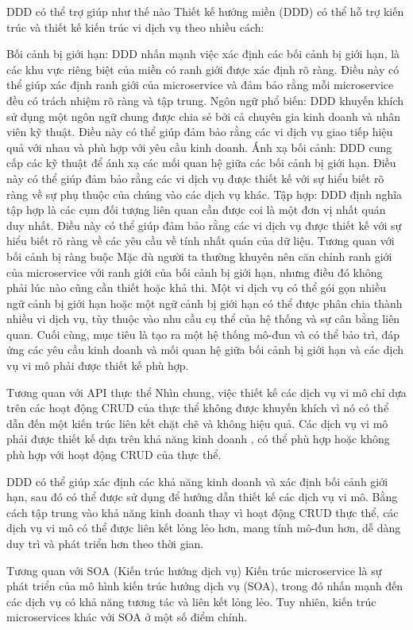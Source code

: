 DDD có thể trợ giúp như thế nào
Thiết kế hướng miền (DDD) có thể hỗ trợ kiến ​​trúc và thiết kế kiến ​​trúc vi dịch vụ theo nhiều cách:

Bối cảnh bị giới hạn: DDD nhấn mạnh việc xác định các bối cảnh bị giới hạn, là các khu vực riêng biệt của miền có ranh giới được xác định rõ ràng. Điều này có thể giúp xác định ranh giới của microservice và đảm bảo rằng mỗi microservice đều có trách nhiệm rõ ràng và tập trung.
Ngôn ngữ phổ biến: DDD khuyến khích sử dụng một ngôn ngữ chung được chia sẻ bởi cả chuyên gia kinh doanh và nhân viên kỹ thuật. Điều này có thể giúp đảm bảo rằng các vi dịch vụ giao tiếp hiệu quả với nhau và phù hợp với yêu cầu kinh doanh.
Ánh xạ bối cảnh: DDD cung cấp các kỹ thuật để ánh xạ các mối quan hệ giữa các bối cảnh bị giới hạn. Điều này có thể giúp đảm bảo rằng các vi dịch vụ được thiết kế với sự hiểu biết rõ ràng về sự phụ thuộc của chúng vào các dịch vụ khác.
Tập hợp: DDD định nghĩa tập hợp là các cụm đối tượng liên quan cần được coi là một đơn vị nhất quán duy nhất. Điều này có thể giúp đảm bảo rằng các vi dịch vụ được thiết kế với sự hiểu biết rõ ràng về các yêu cầu về tính nhất quán của dữ liệu.
Tương quan với bối cảnh bị ràng buộc
Mặc dù người ta thường khuyên nên căn chỉnh ranh giới của microservice với ranh giới của bối cảnh bị giới hạn, nhưng điều đó không phải lúc nào cũng cần thiết hoặc khả thi. Một vi dịch vụ có thể gói gọn nhiều ngữ cảnh bị giới hạn hoặc một ngữ cảnh bị giới hạn có thể được phân chia thành nhiều vi dịch vụ, tùy thuộc vào nhu cầu cụ thể của hệ thống và sự cân bằng liên quan. Cuối cùng, mục tiêu là tạo ra một hệ thống mô-đun và có thể bảo trì, đáp ứng các yêu cầu kinh doanh và mối quan hệ giữa bối cảnh bị giới hạn và các dịch vụ vi mô phải được thiết kế phù hợp.

Tương quan với API thực thể
Nhìn chung, việc thiết kế các dịch vụ vi mô chỉ dựa trên các hoạt động CRUD của thực thể không được khuyến khích vì nó có thể dẫn đến một kiến ​​trúc liên kết chặt chẽ và không hiệu quả. Các dịch vụ vi mô phải được thiết kế dựa trên khả năng kinh doanh , có thể phù hợp hoặc không phù hợp với hoạt động CRUD của thực thể.

DDD có thể giúp xác định các khả năng kinh doanh và xác định bối cảnh giới hạn, sau đó có thể được sử dụng để hướng dẫn thiết kế các dịch vụ vi mô. Bằng cách tập trung vào khả năng kinh doanh thay vì hoạt động CRUD thực thể, các dịch vụ vi mô có thể được liên kết lỏng lẻo hơn, mang tính mô-đun hơn, dễ dàng duy trì và phát triển hơn theo thời gian.

Tương quan với SOA (Kiến trúc hướng dịch vụ)
Kiến trúc microservice là sự phát triển của mô hình kiến ​​trúc hướng dịch vụ (SOA), trong đó nhấn mạnh đến các dịch vụ có khả năng tương tác và liên kết lỏng lẻo. Tuy nhiên, kiến ​​trúc microservices khác với SOA ở một số điểm chính.

